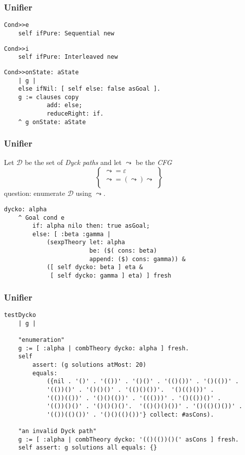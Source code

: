 \documentclass{beamer}
\begin{document}
\begin{frame}[fragile]
\frametitle{Unifier}
\begin{verbatim}
Cond>>e
    self ifPure: Sequential new
\end{verbatim}
\begin{verbatim}
Cond>>i
    self ifPure: Interleaved new
\end{verbatim}
\begin{verbatim}
Cond>>onState: aState
    | g |
    else ifNil: [ self else: false asGoal ].
    g := clauses copy
            add: else;
            reduceRight: if.
    ^ g onState: aState
\end{verbatim}
\end{frame}

\begin{frame}[fragile]
\frametitle{Unifier}
Let $\mathcal{D}$ be the set of \textit{Dyck paths} and let $\leadsto$ be the \textit{CFG}
$$
\left\lbrace\begin{array}{l}
\leadsto = \varepsilon \\
\leadsto = ( \leadsto ) \leadsto \\
\end{array}\right\rbrace
$$
question: enumerate $\mathcal{D}$ using $\leadsto$.
\begin{verbatim}
dycko: alpha
    ^ Goal cond e
        if: alpha nilo then: true asGoal;
        else: [ :beta :gamma | 
            (sexpTheory let: alpha 
                        be: ($( cons: beta) 
                        append: ($) cons: gamma)) & 
            ([ self dycko: beta ] eta & 
             [ self dycko: gamma ] eta) ] fresh
\end{verbatim}
\end{frame}

\begin{frame}[fragile]
\frametitle{Unifier}
\begin{verbatim}
testDycko
    | g |

    "enumeration"
    g := [ :alpha | combTheory dycko: alpha ] fresh.
    self
        assert: (g solutions atMost: 20)
        equals:
            ({nil . '()' . '(())' . '()()' . '(()())' . '()(())' . 
            '(())()' . '()()()' . '(()()())'.  '()(()())' . 
            '(())(())' . '()()(())' . '((()))' . '()(())()' . 
            '(())()()' . '()()()()'.  '(()()()())' . '()(()()())' . 
            '(())(()())' . '()()(()())'} collect: #asCons).

    "an invalid Dyck path"
    g := [ :alpha | combTheory dycko: '(()(())()(' asCons ] fresh.  
    self assert: g solutions all equals: {}
\end{verbatim}
\end{frame}
\end{document}
